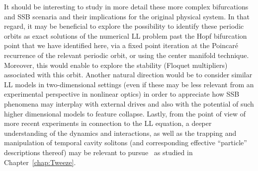 It should be interesting to study in more detail these
more complex bifurcations and SSB scenaria and their implications 
for the original physical system. In that regard, it may be beneficial
to explore the possibility to identify these periodic orbits as
exact solutions of the numerical LL problem past the Hopf bifurcation
point that we have identified here, via a fixed point iteration
at the Poincar{\'e} recurrence of the relevant periodic orbit, or using the center manifold technique.
Moreover, this would enable to explore the stability (Floquet
multipliers) associated with this orbit. Another natural direction
would be to consider similar LL models in two-dimensional
settings (even if these may be less relevant from an 
experimental perspective in nonlinear optics) in order to
appreciate how SSB phenomena may interplay with external drives
and also with the potential of such higher dimensional models
to feature collapse. Lastly, from the point of view of more
recent experiments in connection to the LL equation, a deeper
understanding of the dynamics and interactions, as well as the
trapping and manipulation of temporal cavity solitons 
(and corresponding effective ``particle'' descriptions thereof)
may be relevant to pursue~\cite{tweezing,patterns} as studied in Chapter~\ref{chap:Tweeze}.

\clearpage